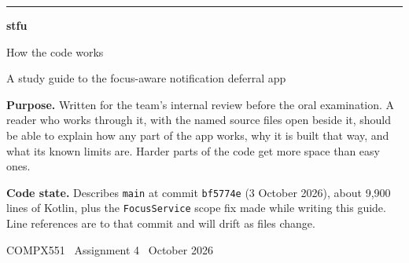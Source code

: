 \documentclass[10pt,a4paper]{article}
\newcommand{\code}[1]{\texttt{#1}}                  %
\begin{document}
\begin{titlepage}
\centering
\vspace*{2.5cm}
{\color{teal}\rule{\textwidth}{1.2pt}}\par\vspace{0.6cm}
{\Huge\bfseries\color{teal} stfu}\par\vspace{0.3cm}
{\LARGE How the code works}\par\vspace{0.5cm}
{\large A study guide to the focus-aware notification deferral app}\par
\vspace{0.6cm}{\color{teal}\rule{\textwidth}{1.2pt}}\par
\vspace{1.2cm}
\vfill
\begin{minipage}{0.8\textwidth}\small
\textbf{Purpose.} Written for the team's internal review before the oral examination. A reader who
works through it, with the named source files open beside it, should be able to explain how any
part of the app works, why it is built that way, and what its known limits are. Harder parts of
the code get more space than easy ones.\par\medskip
\textbf{Code state.} Describes \code{main} at commit \code{bf5774e} (3 October 2026), about
9{,}900 lines of Kotlin, plus the \code{FocusService} scope fix made while writing this guide.
Line references are to that commit and will drift as files change.
\end{minipage}
\vspace{1cm}
\par{\small COMPX551 \textperiodcentered\ Assignment 4 \textperiodcentered\ October 2026}
\end{titlepage}
\end{document}
